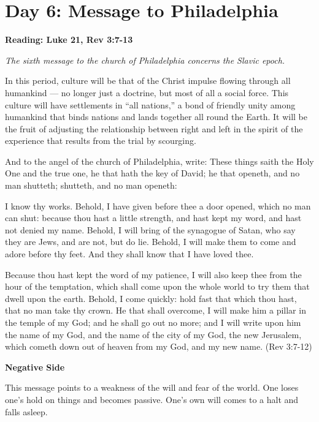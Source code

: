 \section{Day 6: Message to Philadelphia}

\textbf{Reading: Luke 21, Rev 3:7-13}

\emph{The sixth message to the church of Philadelphia concerns the Slavic epoch.}

\begin{quotex}
In this period, culture will be that of the Christ impulse flowing through all humankind — no longer just a doctrine, but most of all a social force. This culture will have settlements in ``all nations,'' a bond of friendly unity among humankind that binds nations and lands together all round the Earth. It will be the fruit of adjusting the relationship between right and left in the spirit of the experience that results from the trial by scourging. 

\end{quotex}
And to the angel of the church of Philadelphia, write: These things saith the Holy One and the true one, he that hath the key of David; he that openeth, and no man shutteth; shutteth, and no man openeth:

I know thy works. Behold, I have given before thee a door opened, which no man can shut: because thou hast a little strength, and hast kept my word, and hast not denied my name. Behold, I will bring of the synagogue of Satan, who say they are Jews, and are not, but do lie. Behold, I will make them to come and adore before thy feet. And they shall know that I have loved thee.

Because thou hast kept the word of my patience, I will also keep thee from the hour of the temptation, which shall come upon the whole world to try them that dwell upon the earth. Behold, I come quickly: hold fast that which thou hast, that no man take thy crown. He that shall overcome, I will make him a pillar in the temple of my God; and he shall go out no more; and I will write upon him the name of my God, and the name of the city of my God, the new Jerusalem, which cometh down out of heaven from my God, and my new name. (Rev 3:7-12)

\textbf{Negative Side}

This message points to a weakness of the will and fear of the world. One loses one's hold on things and becomes passive. One's own will comes to a halt and falls asleep.

